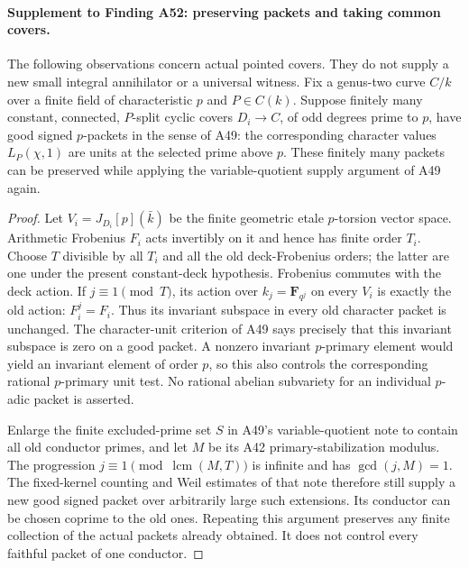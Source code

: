 \paragraph{Supplement to Finding A52: preserving packets and taking common covers.}
The following observations concern actual pointed covers. They do not
supply a new small integral annihilator or a universal witness.
Fix a genus-two curve $C/k$ over a finite field of characteristic $p$
and $P\in C(k)$. Suppose finitely many constant, connected,
$P$-split cyclic covers $D_i\to C$, of odd degrees prime to $p$,
have good signed $p$-packets in the sense of A49: the corresponding
character values $L_P(\chi,1)$ are units at the selected prime above $p$.
These finitely many packets can be preserved while applying the
variable-quotient supply argument of A49 again.

\begin{proof}
Let $V_i=J_{D_i}[p](\bar k)$ be the finite geometric etale
$p$-torsion vector space. Arithmetic Frobenius $F_i$ acts invertibly
on it and hence has finite order $T_i$. Choose $T$ divisible by all
$T_i$ and all the old deck-Frobenius orders; the latter are one
under the present constant-deck hypothesis. Frobenius commutes
with the deck action. If $j\equiv1\pmod T$, its action over
$k_j=\mathbf F_{q^j}$ on every $V_i$ is exactly the old action:
$F_i^j=F_i$. Thus its invariant subspace in every old character
packet is unchanged. The character-unit criterion of A49 says
precisely that this invariant subspace is zero on a good packet.
A nonzero invariant $p$-primary element would yield an invariant
element of order $p$, so this also controls the corresponding
rational $p$-primary unit test. No rational abelian subvariety
for an individual $p$-adic packet is asserted.

Enlarge the finite excluded-prime set $S$ in A49's
variable-quotient note to contain all old conductor primes, and
let $M$ be its A42 primary-stabilization modulus. The progression
$j\equiv1\pmod{\operatorname{lcm}(M,T)}$ is infinite and has
$\gcd(j,M)=1$. The fixed-kernel counting and Weil estimates of
that note therefore still supply a new good signed packet over
arbitrarily large such extensions. Its conductor can be chosen
coprime to the old ones. Repeating this argument preserves any
finite collection of the actual packets already obtained.
It does not control every faithful packet of one conductor.
\end{proof}

